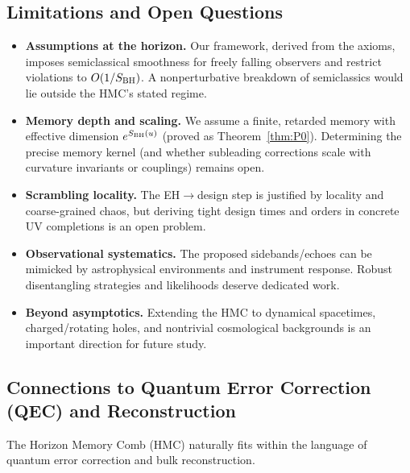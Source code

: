 \documentclass[aps,prd,preprint,onecolumn,superscriptaddress,nofootinbib,longbibliography,floatfix,11pt,showpacs,showkeys]{revtex4-2}
\newcommand{\HMC}{\textsc{HMC}\xspace}
\theoremstyle{plain}
\theoremstyle{definition}
\theoremstyle{remark}
\begin{document}
\subsection{Limitations and Open Questions}
\label{sec:limitations-oq}
\begin{itemize}[leftmargin=*]
    \item \textbf{Assumptions at the horizon.} Our framework, derived from the axioms, imposes semiclassical
    smoothness for freely falling observers and restrict violations to
    \(O(1/S_{\rm BH})\). A nonperturbative breakdown of semiclassics would lie
    outside the \HMC{}'s stated regime.
    \item \textbf{Memory depth and scaling.} We assume a finite, retarded memory with
    effective dimension \(e^{S_{\rm BH}(u)}\) (proved as Theorem~\ref{thm:P0}). Determining the precise memory kernel
    (and whether subleading corrections scale with curvature invariants or
    couplings) remains open.
    \item \textbf{Scrambling locality.} The EH\(\rightarrow\)design step is justified by
    locality and coarse-grained chaos, but deriving tight design times and orders
    in concrete UV completions is an open problem.
    \item \textbf{Observational systematics.} The proposed sidebands/echoes can be
    mimicked by astrophysical environments and instrument response. Robust
    disentangling strategies and likelihoods deserve dedicated work.
    \item \textbf{Beyond asymptotics.} Extending the \HMC{} to dynamical spacetimes,
    charged/rotating holes, and nontrivial cosmological backgrounds is an
    important direction for future study.
\end{itemize}


\subsection{Connections to Quantum Error Correction (QEC) and Reconstruction}
\label{subsec:qec}
The Horizon Memory Comb (\HMC{}) naturally fits within the language of quantum error correction and bulk reconstruction.
\end{document}
